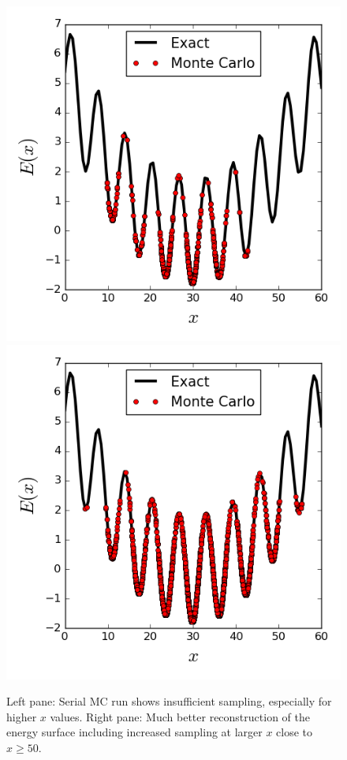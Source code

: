 \documentclass[12pt,letterpaper]{article}
\begin{document}
\begin{figure}[h!]
\centering
\includegraphics[scale=0.5]{artwork/1D_serial.png}
\includegraphics[scale=0.5]{artwork/1D_parallel.png}
\caption{Left pane: Serial MC run shows insufficient sampling, especially for higher $x$ values. Right pane: Much better reconstruction of the energy surface including increased sampling at larger $x$ close to $x \geq 50$.}
\end{figure}
\end{document}
